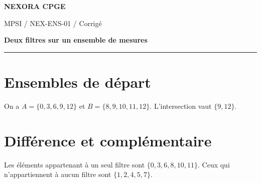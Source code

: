 \documentclass[11pt,a4paper]{article}
\begin{document}
{\small\bfseries\color{nexorablue} NEXORA CPGE}\par
{\small MPSI / NEX-ENS-01 / Corrigé}\par
{\LARGE\bfseries Deux filtres sur un ensemble de mesures}\par
\vspace{0.25em}\hrule\vspace{0.6em}

\section*{Ensembles de départ}
On a $A=\{0,3,6,9,12\}$ et $B=\{8,9,10,11,12\}$. L’intersection vaut $\{9,12\}$.

\section*{Différence et complémentaire}
Les éléments appartenant à un seul filtre sont $\{0,3,6,8,10,11\}$. Ceux qui n’appartiennent à aucun filtre sont $\{1,2,4,5,7\}$.
\end{document}
